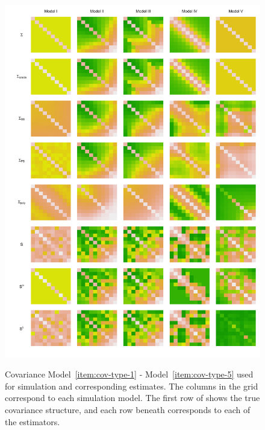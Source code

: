 \begin{figure}[H] 
\centering
\caption{Covariance Model~\ref{item:cov-type-1} - Model~\ref{item:cov-type-5} used for simulation and corresponding estimates. The columns in the grid correspond to each simulation model. The first row of shows the true covariance structure, and each row beneath corresponds to each of the estimators.}
  \includegraphics[width = 1\textwidth]{img/chapter-4/cov-estimate-lattice}\label{fig:cov-estimate-lattice}
\end{figure}

